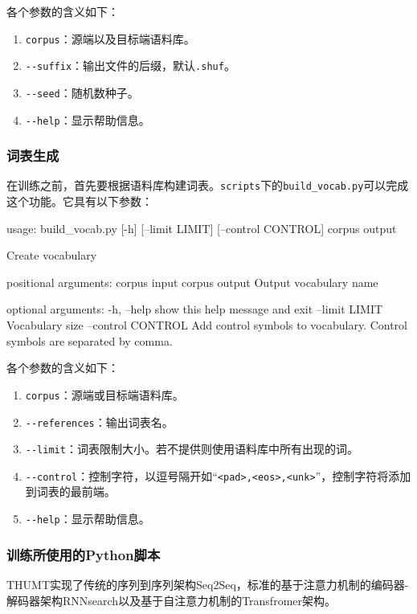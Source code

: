 \documentclass{article}
\begin{document}
各个参数的含义如下：
\begin{enumerate}
\item \verb|corpus|：源端以及目标端语料库。
\item \verb|--suffix|：输出文件的后缀，默认\verb|.shuf|。
\item \verb|--seed|：随机数种子。
\item \verb|--help|：显示帮助信息。
\end{enumerate}


\subsubsection{词表生成}
在训练之前，首先要根据语料库构建词表。\verb|scripts|下的\verb|build_vocab.py|可以完成这个功能。它具有以下参数：
\begin{everbatim}
usage: build_vocab.py [-h] [--limit LIMIT] [--control CONTROL]
                      corpus output

Create vocabulary

positional arguments:
  corpus             input corpus
  output             Output vocabulary name

optional arguments:
  -h, --help         show this help message and exit
  --limit LIMIT      Vocabulary size
  --control CONTROL  Add control symbols to vocabulary.
                     Control symbols are separated by comma.
\end{everbatim}

各个参数的含义如下：
\begin{enumerate}
\item \verb|corpus|：源端或目标端语料库。
\item \verb|--references|：输出词表名。
\item \verb|--limit|：词表限制大小。若不提供则使用语料库中所有出现的词。
\item \verb|--control|：控制字符，以逗号隔开如``\verb|<pad>,<eos>,<unk>|''，控制字符将添加到词表的最前端。
\item \verb|--help|：显示帮助信息。
\end{enumerate}

\subsubsection{训练所使用的Python脚本}
THUMT实现了传统的序列到序列架构Seq2Seq\citep{Sutskever:14}，标准的基于注意力机制的编码器-解码器架构RNNsearch\citep{Bahdanau:15}以及基于自注意力机制的Transfromer架构\citep{vaswani2017attention}。
\end{document}
